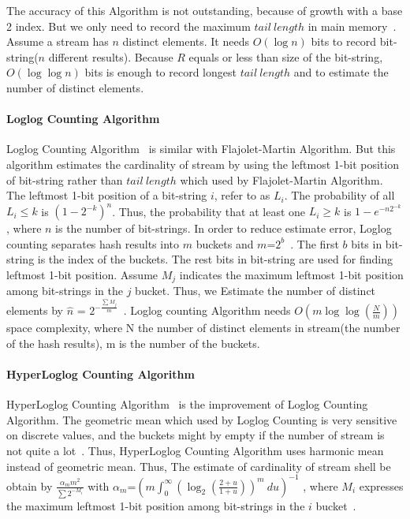 The accuracy of this Algorithm is not outstanding, because of growth with a base
2 index. But we only need to record the maximum $tail\ length$ in main
memory~\cite{leskovec2014mining}. Assume a stream has $n$ distinct elements. It
needs $O(\log n)$ bits to record bit-string($n$ different results). Because $R$
equals or less than size of the bit-string, $O(\log\log n)$ bits is enough to
record longest $tail\ length$ and to estimate the number of distinct elements. 
\paragraph{Loglog Counting Algorithm}

Loglog Counting Algorithm~\cite{durand2003loglog} is similar with
Flajolet-Martin Algorithm. But this algorithm estimates the cardinality of
stream by using the leftmost 1-bit position of bit-string rather than $tail \
length$ which used by Flajolet-Martin Algorithm. The leftmost 1-bit position of
a bit-string $i$, refer to as $L_i$. The probability of all $L_i \leq k$ is
$(1-2^{-k})^n$. Thus, the probability that at least one $L_i \geqslant k$ is
$1-e^{-n2^{-k}}$, where $n$ is the number of bit-strings. In order to reduce
estimate error, Loglog counting separates hash results into $m$ buckets and
$m$=$2^b$~\cite{durand2003loglog}. The first $b$ bits in bit-string is the index
of the buckets. The rest bits in bit-string are used for finding leftmost 1-bit
position. Assume $M_j$ indicates the maximum leftmost 1-bit position among
bit-strings in the $j$ bucket. Thus, we Estimate the number of distinct elements
by $\hat{n}$ = $2^{-\frac{\sum M_j}{m}}$~\cite{durand2003loglog}. Loglog
counting Algorithm needs $O(m \log\log(\frac{N}{m}))$ space complexity, where N
the number of distinct elements in stream(the number of the hash results), m is
the number of the buckets. 

\paragraph{HyperLoglog Counting Algorithm}

HyperLoglog Counting Algorithm~\cite{flajolet2007hyperloglog} is the improvement
of Loglog Counting Algorithm. The geometric mean which used by Loglog Counting is
very sensitive on discrete values, and the buckets might by empty if the number
of stream is not quite a lot~\cite{flajolet2007hyperloglog}. Thus, HyperLoglog
Counting Algorithm uses harmonic mean instead of geometric mean. Thus, The estimate of
cardinality of stream shell be obtain by $\frac{\alpha_m m^2 }{\sum 2^{-M_i}}$
with $\alpha_m$=$(m \int_0^\infty(\log_2(\frac{2+u}{1+u}))^m\ du)^{-1}$ , where
$M_i$ expresses the maximum leftmost 1-bit position among bit-strings in the $i$
bucket~\cite{flajolet2007hyperloglog}.


